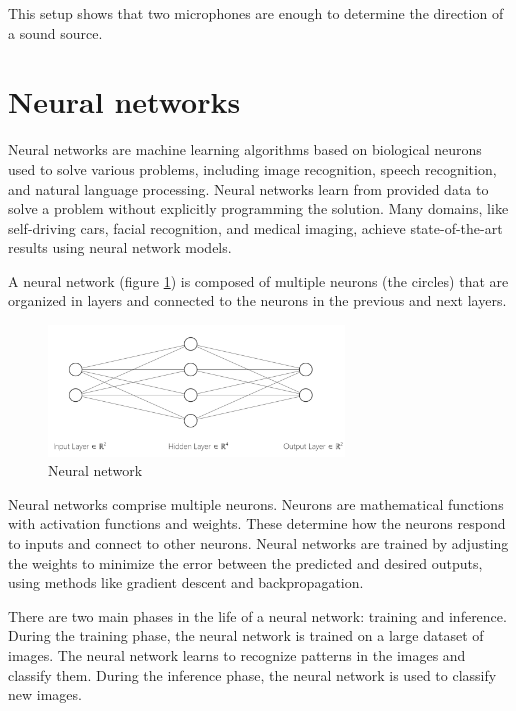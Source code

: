 This setup shows that two microphones are enough to determine the direction of a sound source.

\section{Neural networks}

Neural networks are machine learning algorithms based on biological neurons used to solve various problems, including image recognition, speech recognition, and natural language processing. Neural networks learn from provided data to solve a problem without explicitly programming the solution. Many domains, like self-driving cars, facial recognition, and medical imaging, achieve state-of-the-art results using neural network models. 

A neural network (figure \ref*{fig:neural_network}) is composed of multiple neurons (the circles) that are organized in layers and connected to the neurons in the previous and next layers. 

\begin{figure}[H]
    \centering
    \includegraphics[width=0.7\textwidth]{../Images/neural_network_example.png}
    \caption{Neural network}
    \label{fig:neural_network}
\end{figure}

Neural networks comprise multiple neurons. Neurons are mathematical functions with activation functions and weights. These determine how the neurons respond to inputs and connect to other neurons. Neural networks are trained by adjusting the weights to minimize the error between the predicted and desired outputs, using methods like gradient descent\cite{zhang2019gradient} and backpropagation\cite{Sekhar}.

There are two main phases in the life of a neural network: training and inference. During the training phase, the neural network is trained on a large dataset of images. The neural network learns to recognize patterns in the images and classify them. During the inference phase, the neural network is used to classify new images.

